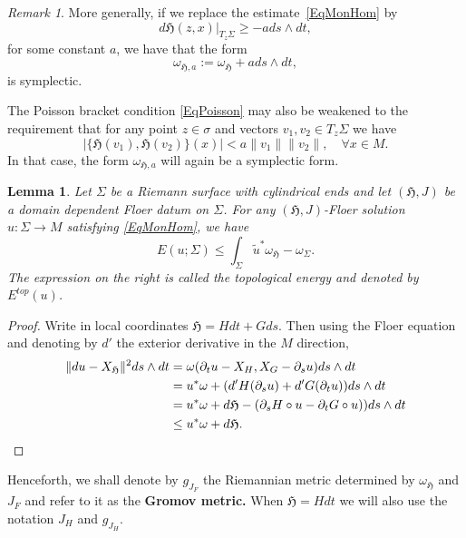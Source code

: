 \documentclass[11pt]{amsart}
\newtheorem{lm}[tm]{Lemma}
\theoremstyle{definition}
\theoremstyle{remark}
\newtheorem{rem}[tm]{Remark}
\begin{document}
\begin{rem}
More generally, if we replace the estimate~\eqref{EqMonHom} by
\begin{equation}\label{EqMonHom1}
d\mathfrak{H}(z,x)|_{T_z\Sigma}\geq -ads\wedge dt,
\end{equation}
for some constant $a$, we have that the form
\[
\omega_{\mathfrak{H},a}:=\omega_\mathfrak{H}+ads\wedge dt,
\]
is symplectic.

The Poisson bracket condition \eqref{EqPoisson} may also be weakened to the requirement that for any point $z\in\sigma$ and vectors $v_1,v_2\in T_z\Sigma$ we have
\begin{equation}\label{eqWeakPoisson}
|\{\mathfrak{H}(v_1),\mathfrak{H}(v_2)\}(x)|<a\|v_1\|\|v_2\|,\quad\forall x\in M.
\end{equation}
In that case, the form $\omega_{\mathfrak{H},a}$ will again be a symplectic form.
\end{rem}


\begin{lm}\label{lmTopGeoEnEst}
Let $\Sigma$ be a Riemann surface with cylindrical ends and let $(\mathfrak{H},J)$ be a domain dependent Floer datum on $\Sigma$. For any $(\mathfrak{H},J)$-Floer solution $u:\Sigma\to M$ satisfying \eqref{EqMonHom}, we have
\[
E(u;\Sigma)\leq\int_{\Sigma}\tilde{u}^*\omega_\mathfrak{H}-\omega_\Sigma.
\]
The expression on the right is called the topological energy and denoted by $E^{top}(u)$.
\end{lm}

\begin{proof}
Write in local coordinates $\mathfrak{H}=Hdt+Gds$. Then using the Floer equation and denoting by $d'$ the exterior derivative in the $M$ direction,
\begin{align}
\|du-X_\mathfrak{H}\|^2ds\wedge dt&=\omega(\partial_tu-X_H,X_G-\partial_su)ds\wedge dt\notag\\
&=u^*\omega+(d'H(\partial_su)+d'G(\partial_tu))ds\wedge dt\notag\\
&=u^*\omega+d\mathfrak{H}-(\partial_sH\circ u-\partial_tG\circ u))ds\wedge dt\notag\\
&\leq u^*\omega+d\mathfrak{H}.\notag
\end{align}
\end{proof}
Henceforth, we shall denote by $g_{J_F}$ the Riemannian metric determined by $\omega_\mathfrak{H}$ and $J_F$ and refer to it as the \textbf{Gromov metric.} When $\mathfrak{H}=Hdt$ we will also use the notation $J_H$ and $g_{J_H}$.
\end{document}

